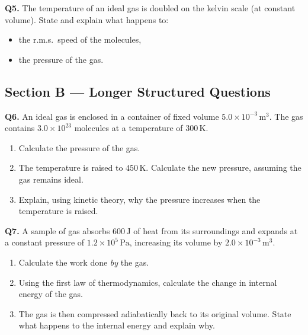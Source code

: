 \bigskip
\noindent\begin{minipage}{\textwidth}
\textbf{Q5.} The temperature of an ideal gas is doubled on the kelvin scale (at
constant volume). State and explain what happens to:
\begin{itemize}[nosep]
  \item the r.m.s.\ speed of the molecules,
  \item the pressure of the gas.
\end{itemize}
\end{minipage}

\subsection*{Section B — Longer Structured Questions}

\noindent\begin{minipage}{\textwidth}
\textbf{Q6.} An ideal gas is enclosed in a container of fixed volume
$5.0\times10^{-3}\,\mathrm{m}^3$. The gas contains $3.0\times10^{23}$ molecules at
a temperature of $300\,\mathrm{K}$.

\begin{enumerate}[label=(\alph*)]
  \item Calculate the pressure of the gas.
  \item The temperature is raised to $450\,\mathrm{K}$. Calculate the new pressure,
        assuming the gas remains ideal.
  \item Explain, using kinetic theory, why the pressure increases when the temperature
        is raised.
\end{enumerate}
\end{minipage}

\bigskip
\noindent\begin{minipage}{\textwidth}
\textbf{Q7.} A sample of gas absorbs $600\,\mathrm{J}$ of heat from its surroundings
and expands at a constant pressure of $1.2\times10^5\,\mathrm{Pa}$, increasing its
volume by $2.0\times10^{-3}\,\mathrm{m}^3$.

\begin{enumerate}[label=(\alph*)]
  \item Calculate the work done \emph{by} the gas.
  \item Using the first law of thermodynamics, calculate the change in internal energy
        of the gas.
  \item The gas is then compressed adiabatically back to its original volume. State
        what happens to the internal energy and explain why.
\end{enumerate}
\end{minipage}

